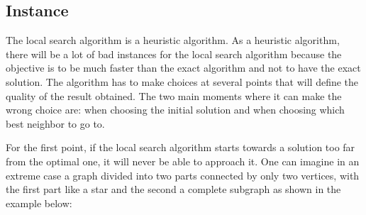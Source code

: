 
\subsection{Instance}

The local search algorithm is a heuristic algorithm. As a heuristic algorithm, there will 
be a lot of bad instances for the local search algorithm because the objective is to be 
much faster than the exact algorithm and not to have the exact solution. The algorithm has 
to make choices at several points that will define the quality of the result obtained. The 
two main moments where it can make the wrong choice are: when choosing the initial solution 
and when choosing which best neighbor to go to.
\bigskip

For the first point, if the local search algorithm starts towards a solution too far 
from the optimal one, it will never be able to approach it. One can imagine in an extreme 
case a graph divided into two parts connected by only two vertices, with the first part like 
a star and the second a complete subgraph as shown in the example below:

